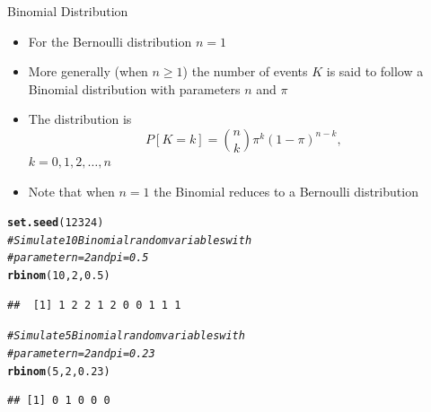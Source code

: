 \documentclass[xcolor=x11names,compress]{beamer}\usepackage[]{graphicx}\usepackage[]{color}
\makeatletter
\newcommand{\hlnum}[1]{\textcolor[rgb]{0.686,0.059,0.569}{#1}}%
\newcommand{\hlcom}[1]{\textcolor[rgb]{0.678,0.584,0.686}{\textit{#1}}}%
\newcommand{\hlstd}[1]{\textcolor[rgb]{0.345,0.345,0.345}{#1}}%
\newcommand{\hlkwd}[1]{\textcolor[rgb]{0.737,0.353,0.396}{\textbf{#1}}}%
\newenvironment{kframe}{%
 \def\at@end@of@kframe{}%
 \ifinner\ifhmode%
  \def\at@end@of@kframe{\end{minipage}}%
  \begin{minipage}{\columnwidth}%
 \fi\fi%
 \def\FrameCommand##1{\hskip\@totalleftmargin \hskip-\fboxsep
 \colorbox{shadecolor}{##1}\hskip-\fboxsep
     \hskip-\linewidth \hskip-\@totalleftmargin \hskip\columnwidth}%
 \MakeFramed {\advance\hsize-\width
   \@totalleftmargin\z@ \linewidth\hsize
   \@setminipage}}%
 {\par\unskip\endMakeFramed%
 \at@end@of@kframe}
\newenvironment{knitrout}{}{} %
\makeatother
\begin{document}
\begin{frame}[fragile]{Binomial Distribution}
  \begin{itemize}
  \item For the Bernoulli distribution $n=1$
  \item More generally (when $n \ge 1$) the number of events $K$ is said to follow a Binomial distribution with
        parameters $n$ and $\pi$
  \item The distribution is
    \begin{equation*}
      P[K=k]={n \choose k} \pi^k (1-\pi)^{n-k},
    \end{equation*}
    $k=0,1,2,\ldots,n$
\item Note that when $n=1$ the Binomial reduces to a Bernoulli distribution  
  \end{itemize}
\begin{knitrout}\tiny
{}\color{fgcolor}\begin{kframe}
\begin{alltt}
\hlkwd{set.seed}\hlstd{(}\hlnum{12324}\hlstd{)}
\hlcom{# Simulate 10 Binomial random variables with}
\hlcom{# parameter n=2 and pi=0.5}
\hlkwd{rbinom}\hlstd{(}\hlnum{10}\hlstd{,}\hlnum{2}\hlstd{,}\hlnum{0.5}\hlstd{)}
\end{alltt}
\begin{verbatim}
##  [1] 1 2 2 1 2 0 0 1 1 1
\end{verbatim}
\begin{alltt}
\hlcom{# Simulate 5 Binomial random variables with}
\hlcom{# parameter n=2 and pi=0.23}
\hlkwd{rbinom}\hlstd{(}\hlnum{5}\hlstd{,}\hlnum{2}\hlstd{,}\hlnum{0.23}\hlstd{)}
\end{alltt}
\begin{verbatim}
## [1] 0 1 0 0 0
\end{verbatim}
\end{kframe}
\end{knitrout}
\end{frame}
\end{document}

